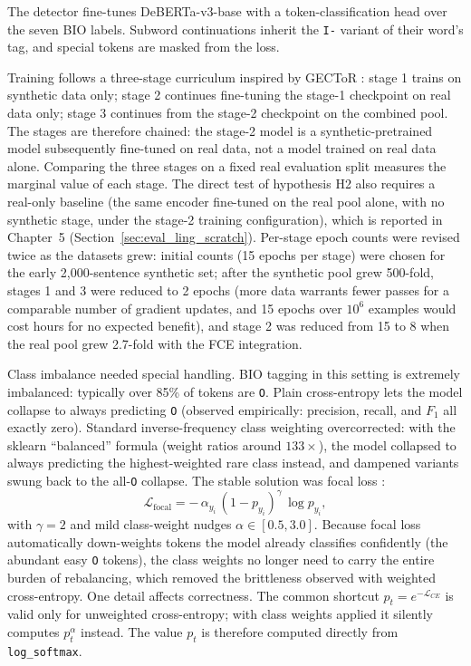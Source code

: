 The detector fine-tunes DeBERTa-v3-base \parencite{He2023DeBERTaV3} with a token-classification head over the seven BIO labels. Subword continuations inherit the \texttt{I-} variant of their word's tag, and special tokens are masked from the loss.

Training follows a three-stage curriculum inspired by GECToR \parencite{Omelianchuk2020GECToR}: stage 1 trains on synthetic data only; stage 2 continues fine-tuning the stage-1 checkpoint on real data only; stage 3 continues from the stage-2 checkpoint on the combined pool. The stages are therefore chained: the stage-2 model is a synthetic-pretrained model subsequently fine-tuned on real data, not a model trained on real data alone. Comparing the three stages on a fixed real evaluation split measures the marginal value of each stage. The direct test of hypothesis H2 also requires a real-only baseline (the same encoder fine-tuned on the real pool alone, with no synthetic stage, under the stage-2 training configuration), which is reported in Chapter~5 (Section~\ref{sec:eval_ling_scratch}). Per-stage epoch counts were revised twice as the datasets grew: initial counts (15 epochs per stage) were chosen for the early 2{,}000-sentence synthetic set; after the synthetic pool grew 500-fold, stages 1 and 3 were reduced to 2 epochs (more data warrants fewer passes for a comparable number of gradient updates, and 15 epochs over $10^6$ examples would cost hours for no expected benefit), and stage 2 was reduced from 15 to 8 when the real pool grew 2.7-fold with the FCE integration.

Class imbalance needed special handling. BIO tagging in this setting is extremely imbalanced: typically over 85\% of tokens are \texttt{O}. Plain cross-entropy lets the model collapse to always predicting \texttt{O} (observed empirically: precision, recall, and $F_1$ all exactly zero). Standard inverse-frequency class weighting overcorrected: with the sklearn ``balanced'' formula (weight ratios around $133\times$), the model collapsed to always predicting the highest-weighted rare class instead, and dampened variants swung back to the all-\texttt{O} collapse. The stable solution was focal loss \parencite{Lin2017Focal}:
\begin{equation}
    \mathcal{L}_{\text{focal}} = -\,\alpha_{y_i}\,(1 - p_{y_i})^{\gamma}\,\log p_{y_i},
\end{equation}
with $\gamma = 2$ and mild class-weight nudges $\alpha \in [0.5, 3.0]$. Because focal loss automatically down-weights tokens the model already classifies confidently (the abundant easy \texttt{O} tokens), the class weights no longer need to carry the entire burden of rebalancing, which removed the brittleness observed with weighted cross-entropy. One detail affects correctness. The common shortcut $p_t = e^{-\mathcal{L}_{CE}}$ is valid only for unweighted cross-entropy; with class weights applied it silently computes $p_t^{\alpha}$ instead. The value $p_t$ is therefore computed directly from \texttt{log\_softmax}.

